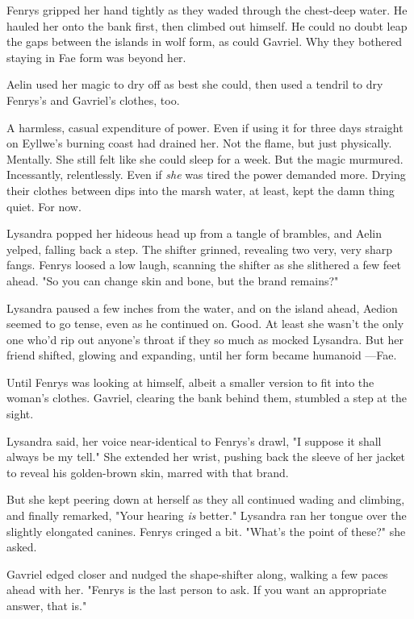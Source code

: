 Fenrys gripped her hand tightly as they waded through the chest-deep water. He hauled her onto the bank first, then climbed out himself. He could no doubt leap the gaps between the islands in wolf form, as could Gavriel. Why they bothered staying in Fae form was beyond her.

Aelin used her magic to dry off as best she could, then used a tendril to dry Fenrys's and Gavriel's clothes, too.

A harmless, casual expenditure of power. Even if using it for three days straight on Eyllwe's burning coast had drained her. Not the flame, but just  physically. Mentally. She still felt like she could sleep for a week. But the magic murmured. Incessantly, relentlessly. Even if
\emph{she} was tired  the power demanded more. Drying their clothes between dips into the marsh water, at least, kept the damn thing quiet. For now.

Lysandra popped her hideous head up from a tangle of brambles, and Aelin yelped, falling back a step. The shifter grinned, revealing two very, very sharp fangs. Fenrys loosed a low laugh, scanning the shifter as she slithered a few feet ahead. "So you can change skin and bone, but the brand remains?"

Lysandra paused a few inches from the water, and on the island ahead, Aedion seemed to go tense, even as he continued on. Good. At least she wasn't the only one who'd rip out anyone's throat if they so much as mocked Lysandra. But her friend shifted, glowing and expanding, until her form became humanoid ---Fae.

Until Fenrys was looking at himself, albeit a smaller version to fit into the woman's clothes. Gavriel, clearing the bank behind them, stumbled a step at the sight.

Lysandra said, her voice near-identical to Fenrys's drawl, "I suppose it shall always be my tell." She extended her wrist, pushing back the sleeve of her jacket to reveal his golden-brown skin, marred with that brand.

But she kept peering down at herself as they all continued wading and climbing, and finally remarked, "Your hearing \emph{is} better." Lysandra ran her tongue over the slightly elongated canines. Fenrys cringed a bit. "What's the point of these?" she asked.

Gavriel edged closer and nudged the shape-shifter along, walking a few paces ahead with her. "Fenrys is the last person to ask. If you want an appropriate answer, that is."

